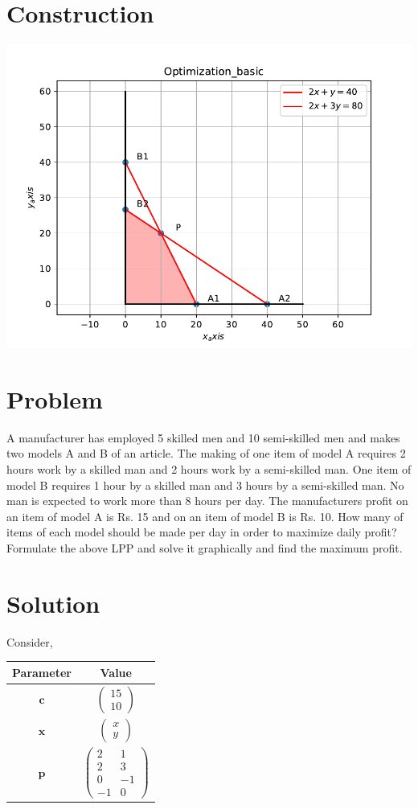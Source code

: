 \documentclass[10pt, a4paper]{article}
\title{\mytitle}
\author{\myauthor\hspace{1em}\\\contact\\FWC22040\hspace{6.5em}IITH\hspace{0.5em}\mymodule\hspace{6em}ASSIGN-8}
\date{}
\newcommand{\myvec}[1]{\ensuremath{\begin{pmatrix}#1\end{pmatrix}}}
\let\vec\mathbf
\begin{document}
 \maketitle
 \tableofcontents

\section{Construction}
\includegraphics[scale=0.5]{im.pdf}

\section{Problem}
A manufacturer has employed 5 skilled men and 10 semi-skilled men and makes two models A and B of an article. The making of one item of model A requires 2 hours work by a skilled man and 2 hours work by a semi-skilled man. One item of model B requires 1 hour by a skilled man and 3 hours by a semi-skilled man. No man is expected to work more than 8 hours per day. The manufacturers profit on an item of model A is Rs. 15 and on an item of model B is Rs. 10. How many of items of each model should be made per day in order to maximize daily profit? Formulate the above LPP and solve it graphically and find the maximum profit.
\section{Solution}
Consider,
\begin{tabular}{|c|c|}
 \hline
 \textbf{Parameter}&\textbf{Value}\\
 \hline
 $\vec{c}$ & $\myvec{15\\10}$ \\
 \hline
 $\vec{x}$ & $\myvec{x\\y}$ \\
 \hline
 $\vec{p}$ & $\myvec{2&1 \\ 2&3 \\ 0&-1 \\ -1&0}$ \\
 \hline
\end{tabular}\\
\end{document}
